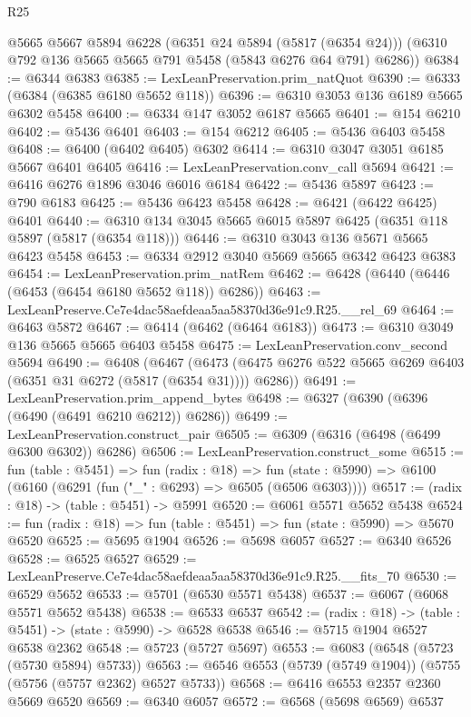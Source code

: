 \begin{lexlean}{R25}
\begin{coremodule}
      @5665
      @5667
      @5894
      @6228
      (@6351 @24 @5894 (@5817 (@6354 @24)))
      (@6310 @792 @136 @5665 @5665 @791 @5458 (@5843 @6276 @64 @791) @6286))
@6384 := @6344 @6383
@6385 := LexLeanPreservation.prim_natQuot
@6390 := @6333 (@6384 (@6385 @6180 @5652 @118))
@6396 := @6310 @3053 @136 @6189 @5665 @6302 @5458
@6400 := @6334 @147 @3052 @6187 @5665
@6401 := @154 @6210
@6402 := @5436 @6401
@6403 := @154 @6212
@6405 := @5436 @6403 @5458
@6408 := @6400 (@6402 @6405) @6302
@6414 := @6310 @3047 @3051 @6185 @5667 @6401 @6405
@6416 := LexLeanPreservation.conv_call @5694
@6421 := @6416 @6276 @1896 @3046 @6016 @6184
@6422 := @5436 @5897
@6423 := @790 @6183
@6425 := @5436 @6423 @5458
@6428 := @6421 (@6422 @6425) @6401
@6440 := @6310 @134 @3045 @5665 @6015 @5897 @6425 (@6351 @118 @5897 (@5817 (@6354 @118)))
@6446 := @6310 @3043 @136 @5671 @5665 @6423 @5458
@6453 := @6334 @2912 @3040 @5669 @5665 @6342 @6423 @6383
@6454 := LexLeanPreservation.prim_natRem
@6462 := @6428 (@6440 (@6446 (@6453 (@6454 @6180 @5652 @118)) @6286))
@6463 := LexLeanPreserve.Ce7e4dac58aefdeaa5aa58370d36e91c9.R25.__rel_69
@6464 := @6463 @5872
@6467 := @6414 (@6462 (@6464 @6183))
@6473 := @6310 @3049 @136 @5665 @5665 @6403 @5458
@6475 := LexLeanPreservation.conv_second @5694
@6490 := @6408
    (@6467 (@6473 (@6475 @6276 @522 @5665 @6269 @6403 (@6351 @31 @6272 (@5817 (@6354 @31)))) @6286))
@6491 := LexLeanPreservation.prim_append_bytes
@6498 := @6327 (@6390 (@6396 (@6490 (@6491 @6210 @6212)) @6286))
@6499 := LexLeanPreservation.construct_pair
@6505 := @6309 (@6316 (@6498 (@6499 @6300 @6302)) @6286)
@6506 := LexLeanPreservation.construct_some
@6515 := fun (table : @5451) =>
  fun (radix : @18) =>
  fun (state : @5990) => @6100 (@6160 (@6291 (fun ("_" : @6293) => @6505 (@6506 @6303))))
@6517 := (radix : @18) -> (table : @5451) -> @5991
@6520 := @6061 @5571 @5652 @5438
@6524 := fun (radix : @18) => fun (table : @5451) => fun (state : @5990) => @5670 @6520
@6525 := @5695 @1904
@6526 := @5698 @6057
@6527 := @6340 @6526
@6528 := @6525 @6527
@6529 := LexLeanPreserve.Ce7e4dac58aefdeaa5aa58370d36e91c9.R25.__fits_70
@6530 := @6529 @5652
@6533 := @5701 (@6530 @5571 @5438)
@6537 := @6067 (@6068 @5571 @5652 @5438)
@6538 := @6533 @6537
@6542 := (radix : @18) -> (table : @5451) -> (state : @5990) -> @6528 @6538
@6546 := @5715 @1904 @6527 @6538 @2362
@6548 := @5723 (@5727 @5697)
@6553 := @6083 (@6548 (@5723 (@5730 @5894) @5733))
@6563 := @6546 @6553 (@5739 (@5749 @1904)) (@5755 (@5756 (@5757 @2362) @6527 @5733))
@6568 := @6416 @6553 @2357 @2360 @5669 @6520
@6569 := @6340 @6057
@6572 := @6568 (@5698 @6569) @6537

\end{coremodule}
\end{lexlean}
